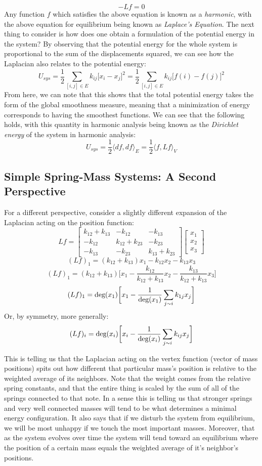 \[
-Lf = 0
\]
Any function \(f\) which satisfies the above equation is known as a
\textit{harmonic}, with the above equation for equilibrium being known
as \textit{Laplace's Equation}. The next thing to consider is how does
one obtain a formulation of the potential energy in the system? By
observing that the potential energy for the whole system is
proportional to the sum of the displacements squared, we can see how
the Laplacian also relates to the potential energy: 
\[
U_{sys} = \frac{1}{2} \sum_{[i,j] \in E} k_{ij} \big[ x_i - x_j\big]^2
= \frac{1}{2} \sum_{[i,j] \in E} k_{ij} \big[ f(i) - f(j)\big]^2 
\]
From here, we can note that this shows that the total potential energy
takes the form of the global smoothness measure, meaning that a
minimization of energy corresponds to having the smoothest
functions. We can see that the following holds, with this quantity in
harmonic analysis being known as the \textit{Dirichlet energy} of the
system in harmonic analysis: 
\[
U_{sys} = \frac{1}{2} \langle df, df \rangle_E = \frac{1}{2} \langle f, Lf \rangle_V
\]
\subsection{Simple Spring-Mass Systems: A Second Perspective}
For a different perspective, consider a slightly different expansion
of the Laplacian acting on the position function:  
\[
Lf = \begin{bmatrix}
    k_{12} + k_{13} & -k_{12} & -k_{13} \\
    -k_{12} & k_{12} + k_{23} & -k_{23} \\
    -k_{13} & -k_{23} & k_{13} + k_{23} 
\end{bmatrix}
\begin{bmatrix}
x_1 \\
x_2\\
x_3
\end{bmatrix}
\]
\[
(Lf)_1 = 
    (k_{12} + k_{13})x_1 -k_{12}x_2 -k_{13}x_3 
\]
\[
(Lf)_1 = 
    (k_{12} + k_{13}) \bigg[ x_1 - \frac{k_{12}}{k_{12} + k_{13}} x_2
  - \frac{k_{13}}{k_{12} + k_{13}} x_3 \bigg] 
\]
\[
(Lf)_1 = 
    \textnormal{deg}(x_1) \bigg[ x_1 - \frac{1}{\textnormal{deg}(x_1)}
      \sum_{j \sim i} k_{1j}x_j  \bigg] 
\]
Or, by symmetry, more generally:
\[
(Lf)_i = 
    \textnormal{deg}(x_i) \bigg[ x_i - \frac{1}{\textnormal{deg}(x_i)}
      \sum_{j \sim i} k_{ij}x_j  \bigg] 
\]

This is telling us that the Laplacian acting on the vertex function
(vector of mass positions) spits out how different that particular
mass's position is relative to the weighted average of its
neighbors. Note that the weight comes from the relative spring
constants, and that the entire thing is scaled by the sum of all of
the springs connected to that note. In a sense this is telling us that
stronger springs and very well connected masses will tend to be what
determines a minimal energy configuration. It also says that if we
disturb the system from equilibrium, we will be most unhappy if we
touch the most important masses. Moreover, that as the system evolves
over time the system will tend toward an equilibrium where the
position of a certain mass equals the weighted average of it's
neighbor's positions.

